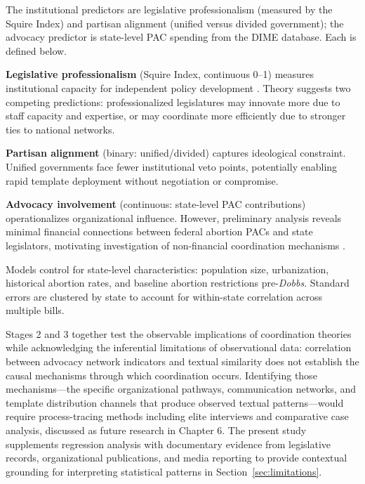 The institutional predictors are legislative professionalism (measured by the Squire Index) and partisan alignment (unified versus divided government); the advocacy predictor is state-level PAC spending from the DIME database. Each is defined below.

\textbf{Legislative professionalism} (Squire Index, continuous 0--1) measures institutional capacity for independent policy development \parencite{squireMeasuringStateLegislative2007, squireSquireIndexUpdate2024}. Theory suggests two competing predictions: professionalized legislatures may innovate more due to staff capacity and expertise, or may coordinate more efficiently due to stronger ties to national networks.

\textbf{Partisan alignment} (binary: unified/divided) captures ideological constraint. Unified governments face fewer institutional veto points, potentially enabling rapid template deployment without negotiation or compromise.

\textbf{Advocacy involvement} (continuous: state-level PAC contributions) operationalizes organizational influence. However, preliminary analysis reveals minimal financial connections between federal abortion PACs and state legislators, motivating investigation of non-financial coordination mechanisms \parencite{baumgartner_jones_1993, hallLobbyingLegislativeSubsidy2006a}.

Models control for state-level characteristics: population size, urbanization, historical abortion rates, and baseline abortion restrictions pre-\emph{Dobbs}. Standard errors are clustered by state to account for within-state correlation across multiple bills.

Stages 2 and 3 together test the observable implications of coordination theories while acknowledging the inferential limitations of observational data: correlation between advocacy network indicators and textual similarity does not establish the causal mechanisms through which coordination occurs. Identifying those mechanisms---the specific organizational pathways, communication networks, and template distribution channels that produce observed textual patterns---would require process-tracing methods including elite interviews and comparative case analysis, discussed as future research in Chapter 6. The present study supplements regression analysis with documentary evidence from legislative records, organizational publications, and media reporting to provide contextual grounding for interpreting statistical patterns in Section~\ref{sec:limitations}.

